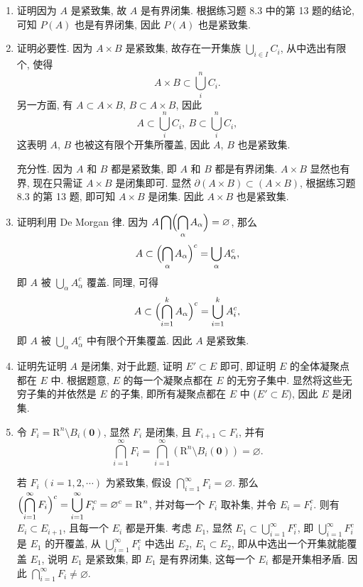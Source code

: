 \documentclass[a4paper, 11pt]{ctexart}
\begin{document}
\begin{enumerate}
    \item %
        {\heiti 证明}\quad 因为 $A$ 是紧致集, 故 $A$ 是有界闭集. 根据练习题 8.3 中的第 13 题的结论,
        可知 $P(A)$ 也是有界闭集, 因此 $P(A)$ 也是紧致集.
    \item %
        {\heiti 证明}\quad 必要性. 因为 $A \times B$ 是紧致集, 故存在一开集族 $\bigcup_{i \in I}C_i$, 从中选出有限个, 使得
        \[
            A \times B \subset \bigcup_{i}^{n}C_i.    
        \]
        另一方面, 有 $A \subset A \times B$, $B \subset A \times B$, 因此
        \[
            A \subset \bigcup_{i}^{n}C_i,\ B \subset \bigcup_{i}^{n}C_i,   
        \]
        这表明 $A$, $B$ 也被这有限个开集所覆盖, 因此 $A$, $B$ 也是紧致集.

        充分性. 因为 $A$ 和 $B$ 都是紧致集, 即 $A$ 和 $B$ 都是有界闭集. $A \times B$ 显然也有界, 现在只需证 $A \times B$ 是闭集即可.
        显然 $\partial(A \times B) \subset (A \times B)$, 根据练习题 8.3 的第 13 题, 即可知 $A \times B$ 是闭集. 因此 $A \times B$ 也是紧致集.
    \item %
        {\heiti 证明}\quad 利用 De Morgan 律. 因为 $\displaystyle{A \bigcap \Bigl(\bigcap_{\alpha}A_\alpha\Bigr) = \varnothing}$, 那么
        \[
            A \subset \Bigl(\bigcap_{\alpha}A_\alpha\Bigr)^c = \bigcup_{\alpha}A_\alpha^c,
        \]
        即 $A$ 被 $\displaystyle{\bigcup_{\alpha}A_\alpha^c}$ 覆盖. 同理, 可得
        \[
            A \subset \Bigl(\bigcap_{i=1}^kA_\alpha\Bigr)^c =  \bigcup_{i=1}^kA_i^c,   
        \]
        即 $A$ 被 $\displaystyle{\bigcup_{\alpha}A_\alpha^c}$ 中有限个开集覆盖. 因此 $A$ 是紧致集.
    \item %
        {\heiti 证明}\quad 先证明 $A$ 是闭集, 对于此题, 证明 $E' \subset E$ 即可, 即证明 $E$ 的全体凝聚点都在 $E$ 中.
        根据题意, $E$ 的每一个凝聚点都在 $E$ 的无穷子集中. 显然将这些无穷子集的并依然是 $E$ 的子集, 即所有凝聚点都在 $E$ 中 ($E' \subset E$), 因此 $E$ 是闭集.
    \item %
        令 $F_i = \mathrm{R}^n \setminus B_i(\boldsymbol{0})$, 显然 $F_i$ 是闭集, 且 $F_{i+1} \subset F_i$, 并有
        \[
            \bigcap_{i=1}^{\infty}F_i = \bigcap_{i=1}^{\infty}\left(\mathrm{R}^n \setminus B_i(\boldsymbol{0})\right) = \varnothing.    
        \]
        
        若 $F_i\ (i = 1, 2, \cdots)$ 为紧致集, 假设 $\displaystyle{\bigcap_{i=1}^{\infty}F_i = \varnothing}$.
        那么 $\displaystyle{\Bigl(\bigcap_{i=1}^{\infty}F_i\Bigr)^c = \bigcup_{i=1}^{\infty}F_i^c = \varnothing^c = \mathrm{R}^n}$, 并对每一个 $F_i$ 取补集, 并令 $E_i = F_i^c$.
        则有 $E_i \subset E_{i+1}$, 且每一个 $E_i$ 都是开集. 考虑 $E_1$, 显然 $E_1 \subset \bigcup_{i=1}^{\infty}F_i^c$, 即 $\bigcup_{i=1}^{\infty}F_i^c$ 是 $E_1$ 的开覆盖,
        从 $\bigcup_{i=1}^{\infty}F_i^c$ 中选出 $E_2$, $E_1 \subset E_2$, 即从中选出一个开集就能覆盖 $E_1$, 说明 $E_1$ 是紧致集, 即 $E_1$ 是有界闭集, 这每一个 $E_i$ 都是开集相矛盾.
        因此 $\displaystyle{\bigcap_{i=1}^{\infty}F_i \neq \varnothing}$.
\end{enumerate}
\end{document}
